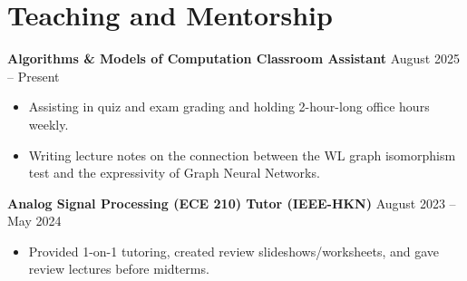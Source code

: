 \documentclass[letterpaper,10pt]{article}
\begin{document}
\section{Teaching and Mentorship}
\textbf{Algorithms \& Models of Computation Classroom Assistant} \hfill August 2025 -- Present\vspace{-5pt}
\begin{itemize}[itemsep=-5pt, parsep=5pt, leftmargin=0.25in]
    \item Assisting in quiz and exam grading and holding 2-hour-long office hours weekly.
    \item Writing lecture notes on the connection between the WL graph isomorphism test and the expressivity of Graph Neural Networks.
\end{itemize}
\textbf{Analog Signal Processing (ECE 210) Tutor (IEEE-HKN)} \hfill August 2023 -- May 2024\vspace{-5pt}
\begin{itemize}[itemsep=-5pt, parsep=5pt, leftmargin=0.25in]
    \item Provided 1-on-1 tutoring, created review slideshows/worksheets, and gave review lectures before midterms.
\end{itemize}

\pagebreak
\end{document}
